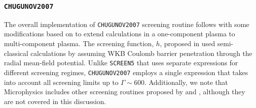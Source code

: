 \documentclass[preprint,times,tighten,linenumbers,trackchanges]{aastex631}
\newcommand{\microphysics}{{\sf Microphysics}}
\begin{document}
\subsubsection{{\tt CHUGUNOV2007}}

The overall implementation of {\tt CHUGUNOV2007} screening routine follows \cite{Chugunov_2007} with some modifications based on \cite{Yakovlev_2006} to extend calculations in a one-component plasma to multi-component plasma. The screening function, $h$, proposed in \cite{Chugunov_2007} used semi-classical calculations by assuming WKB Coulomb barrier penetration through the radial mean-field potential. Unlike {\tt SCREEN5} that uses separate expressions for different screening regimes, {\tt CHUGUNOV2007} employs a single expression that takes into account all screening limits up to $\Gamma \sim 600$. Additionally, we note that {\microphysics} includes other screening routines proposed by \cite{Chugunov_2009} and \cite{Chabrier:1998, Calder:2007}, although they are not covered in this discussion.


\end{document}
